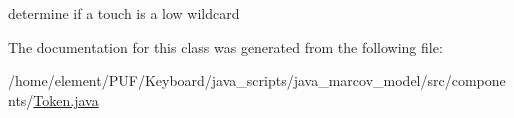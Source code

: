 determine if a touch is a low wildcard 



The documentation for this class was generated from the following file\+:\begin{DoxyCompactItemize}
\item 
/home/element/\+P\+U\+F/\+Keyboard/java\+\_\+scripts/java\+\_\+marcov\+\_\+model/src/components/\hyperlink{_token_8java}{Token.\+java}\end{DoxyCompactItemize}
